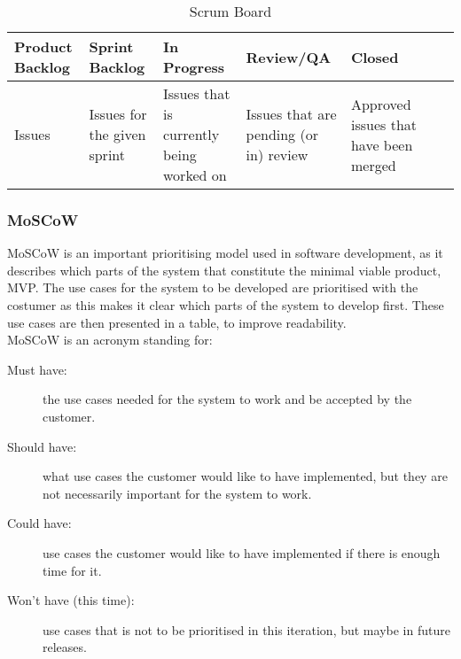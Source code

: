 \begin{table}[H]
    \begin{tabularx}{\textwidth}{|>{\RaggedRight}X|>{\RaggedRight}X|>{\RaggedRight}X|>{\RaggedRight}X|>{\RaggedRight}X|>{\RaggedRight}X|>{\RaggedRight}X|}
        \hline                             
        \textbf{Product Backlog} & \textbf{Sprint Backlog} & \textbf{In Progress} & \textbf{Review/QA} & \textbf{Closed} \\
        \hline
        Issues & Issues for the given sprint & Issues that is currently being worked on & Issues that are pending (or in) review & Approved issues that have been merged    \\
        \hline
    \end{tabularx}
    \caption{Scrum Board} 
    \label{table:scrum}
\end{table} 

\subsubsection{MoSCoW}
MoSCoW is an important prioritising model used in software development, as it
describes which parts of the system that constitute the minimal viable product,
MVP. The use cases for the system to be developed are prioritised with the
costumer as this makes it clear which parts of the system to develop first.
These use cases are then presented in a table, to improve readability.\\

MoSCoW is an acronym standing for:\\

\begin{description}
    \item [Must have:] the use cases needed for the system to work and be
    accepted by the customer.

    \item [Should have:] what use cases the customer would like to have
    implemented, but they are not necessarily important for the system to work.

    \item [Could have:] use cases the customer would like to have implemented if
    there is enough time for it.

    \item [Won't have (this time):] use cases that is not to be prioritised in
    this iteration, but maybe in future releases.
\end{description}

